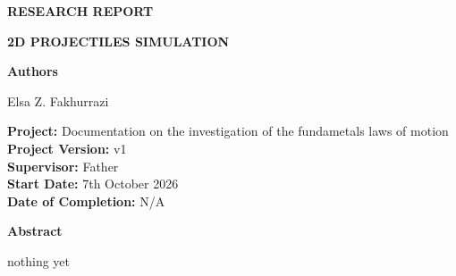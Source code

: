 \documentclass[a4paper]{report}
\begin{document}
\begin{center}

{\fontsize{18}{22}\selectfont\textbf{RESEARCH REPORT}}

\vspace{1cm}

{\fontsize{18}{22}\selectfont\textbf{2D PROJECTILES SIMULATION\\[6pt]}}

\vspace{1cm}

{\fontsize{12}{14}\selectfont\textbf{Authors}}

\vspace{0.3cm}

{\fontsize{12}{14}\selectfont
Elsa Z. Fakhurrazi\\
}

\vspace{0.8cm}

{\fontsize{12}{14}\selectfont
\textbf{Project:} Documentation on the investigation of the fundametals laws of motion\\
\vspace{0.8cm}
\textbf{Project Version:} v1 \\
\textbf{Supervisor:} Father\\
\textbf{Start Date:} 7th October 2026\\
\textbf{Date of Completion:} N/A

}

\end{center}


\vspace{0.5cm}

\noindent
\textbf{Abstract}

nothing yet 


\vspace{0.2cm}

\begin{justify}



\vspace{0.3cm}

\end{justify}




\newpage
\end{document}
